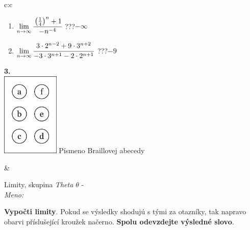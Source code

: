 \documentclass[10pt]{report}
\begin{document}
\begin{tabular}{c:c}
\begin{minipage}[c][104.5mm][t]{0.5\linewidth}
\begin{center}
\begin{minipage}{0.79\linewidth}
\begin{center}
\begin{varwidth}{\linewidth}
\begin{enumerate}
\item $\lim\limits_{n\to\infty}\cfrac{\left(\frac{1}{4}\right)^n +1}{-n^{-4}}$\quad \dotfill\; ???\;\dotfill \quad $-\infty$
\item $\lim\limits_{n\to\infty}\cfrac{3\cdot 2^{n-2}+9\cdot 3^{n+2}}{-3\cdot 3^{n+1}-2\cdot 2^{n+1}}$\quad \dotfill\; ???\;\dotfill \quad $-9$
\end{enumerate}
\end{varwidth}
\end{center}
\end{minipage}
\begin{minipage}{0.20\linewidth}
\begin{center}
{\Huge\bfseries 3.} \\[2mm]
\includegraphics[height=40mm]{../images/braille.png}
{\small Písmeno Braillovej abecedy}
\end{center}
\end{minipage}
\end{center}
\end{minipage}
&
\begin{minipage}[c][104.5mm][t]{0.5\linewidth}
\begin{center}
\vspace{7mm}
{\huge Limity, skupina \textit{Theta $\theta$} -}\\[5mm]
\textit{Meno:}\phantom{xxxxxxxxxxxxxxxxxxxxxxxxxxxxxxxxxxxxxxxxxxxxxxxxxxxxxxxxxxxxxxxxx}\\[5mm]
\begin{minipage}{0.95\linewidth}
\begin{center}
\textbf{Vypočti limity}. Pokud se výsledky shodujú s tými za otazníky, tak napravo\\obarvi příslušející kroužek načerno. \textbf{Spolu odevzdejte výsledné slovo}.
\end{center}
\end{minipage}
\\[1mm]
\begin{minipage}{0.79\linewidth}
\begin{center}
\begin{varwidth}{\linewidth}

\end{varwidth}
\end{center}
\end{minipage}
\end{center}
\end{minipage}
\end{tabular}
\end{document}
